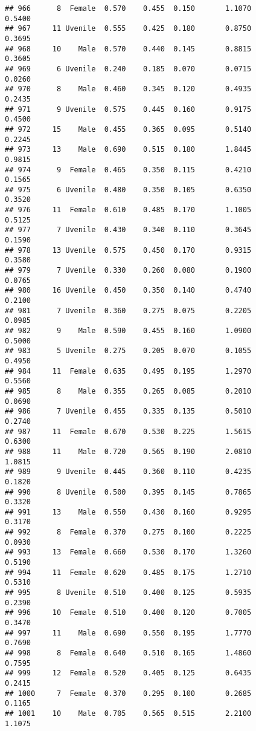 \documentclass[
]{article}
\begin{document}
\begin{verbatim}
## 966      8  Female  0.570    0.455  0.150       1.1070         0.5400
## 967     11 Uvenile  0.555    0.425  0.180       0.8750         0.3695
## 968     10    Male  0.570    0.440  0.145       0.8815         0.3605
## 969      6 Uvenile  0.240    0.185  0.070       0.0715         0.0260
## 970      8    Male  0.460    0.345  0.120       0.4935         0.2435
## 971      9 Uvenile  0.575    0.445  0.160       0.9175         0.4500
## 972     15    Male  0.455    0.365  0.095       0.5140         0.2245
## 973     13    Male  0.690    0.515  0.180       1.8445         0.9815
## 974      9  Female  0.465    0.350  0.115       0.4210         0.1565
## 975      6 Uvenile  0.480    0.350  0.105       0.6350         0.3520
## 976     11  Female  0.610    0.485  0.170       1.1005         0.5125
## 977      7 Uvenile  0.430    0.340  0.110       0.3645         0.1590
## 978     13 Uvenile  0.575    0.450  0.170       0.9315         0.3580
## 979      7 Uvenile  0.330    0.260  0.080       0.1900         0.0765
## 980     16 Uvenile  0.450    0.350  0.140       0.4740         0.2100
## 981      7 Uvenile  0.360    0.275  0.075       0.2205         0.0985
## 982      9    Male  0.590    0.455  0.160       1.0900         0.5000
## 983      5 Uvenile  0.275    0.205  0.070       0.1055         0.4950
## 984     11  Female  0.635    0.495  0.195       1.2970         0.5560
## 985      8    Male  0.355    0.265  0.085       0.2010         0.0690
## 986      7 Uvenile  0.455    0.335  0.135       0.5010         0.2740
## 987     11  Female  0.670    0.530  0.225       1.5615         0.6300
## 988     11    Male  0.720    0.565  0.190       2.0810         1.0815
## 989      9 Uvenile  0.445    0.360  0.110       0.4235         0.1820
## 990      8 Uvenile  0.500    0.395  0.145       0.7865         0.3320
## 991     13    Male  0.550    0.430  0.160       0.9295         0.3170
## 992      8  Female  0.370    0.275  0.100       0.2225         0.0930
## 993     13  Female  0.660    0.530  0.170       1.3260         0.5190
## 994     11  Female  0.620    0.485  0.175       1.2710         0.5310
## 995      8 Uvenile  0.510    0.400  0.125       0.5935         0.2390
## 996     10  Female  0.510    0.400  0.120       0.7005         0.3470
## 997     11    Male  0.690    0.550  0.195       1.7770         0.7690
## 998      8  Female  0.640    0.510  0.165       1.4860         0.7595
## 999     12  Female  0.520    0.405  0.125       0.6435         0.2415
## 1000     7  Female  0.370    0.295  0.100       0.2685         0.1165
## 1001    10    Male  0.705    0.565  0.515       2.2100         1.1075

\end{verbatim}
\end{document}
